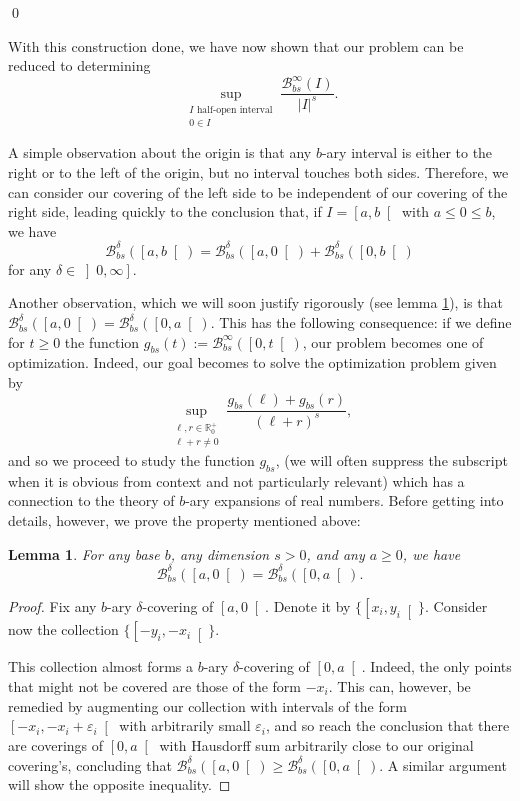 \documentclass[11pt, reqno]{amsart}
\newcommand{\R}{\mathbb{R}}
\newcommand{\BB}{\mathcal{B}}
\newtheorem{lemma}{Lemma}
\begin{document}
\qed

With this construction done, we have now shown that our problem can be reduced to determining
\[\sup_{\substack{\text{$I$ half-open interval}\\ 0 \in I}} \frac{\BB_{bs}^\infty(I)}{\lvert I \rvert^s}.\]

A simple observation about the origin is that any $b$-ary interval is either to the right or to the left of the origin, but no interval touches both sides. Therefore, we can consider our covering of the left side to be independent of our covering of the right side, leading quickly to the conclusion that, if $I = \left[ a, b \right[$ with $a \leq 0 \leq b$, we have
\[\BB_{bs}^\delta(\left[a, b\right[) = \BB_{bs}^\delta(\left[a, 0\right[) + \BB_{bs}^\delta(\left[0, b\right[)\]
for any $\delta \in \left]0, \infty \right]$.

Another observation, which we will soon justify rigorously (see lemma \ref{sidedoesntmatter}), is that $\BB_{bs}^\delta(\left[a, 0\right[) = \BB_{bs}^\delta(\left[0, a\right[)$. This has the following consequence: if we define for $t \geq 0$ the function $g_{bs}(t) := \BB_{bs}^\infty(\left[0, t \right[)$, our problem becomes one of optimization. Indeed, our goal becomes to solve the optimization problem given by
\[ \sup_{\substack{\ell,r \in \R^+_0\\\ell+r \neq 0}} \frac{g_{bs}(\ell) + g_{bs}(r)}{(\ell + r)^s}, \]
and so we proceed to study the function $g_{bs}$, (we will often suppress the subscript when it is obvious from context and not particularly relevant) which has a connection to the theory of $b$-ary expansions of real numbers. Before getting into details, however, we prove the property mentioned above:

\begin{lemma} \label{sidedoesntmatter}
For any base $b$, any dimension $s > 0$, and any $a \geq 0$, we have
\[\BB_{bs}^\delta(\left[a, 0\right[) = \BB_{bs}^\delta(\left[0, a\right[).\]
\end{lemma}

\begin{proof}
Fix any $b$-ary $\delta$-covering of $\left[a, 0\right[$. Denote it by $\{\left[x_i, y_i\right[\}$. Consider now the collection $\{\left[-y_i, -x_i\right[\}$. 

This collection almost forms a $b$-ary $\delta$-covering of $\left[0, a\right[$. Indeed, the only points that might not be covered are those of the form $-x_i$. This can, however, be remedied by augmenting our collection with intervals of the form $\left[ -x_i, -x_i + \varepsilon_i \right[$ with arbitrarily small $\varepsilon_i$, and so reach the conclusion that there are coverings of $\left[0, a\right[$ with Hausdorff sum arbitrarily close to our original covering's, concluding that $\BB_{bs}^\delta(\left[a, 0\right[) \geq \BB_{bs}^\delta(\left[0, a\right[)$. A similar argument will show the opposite inequality.
\end{proof}
\end{document}
